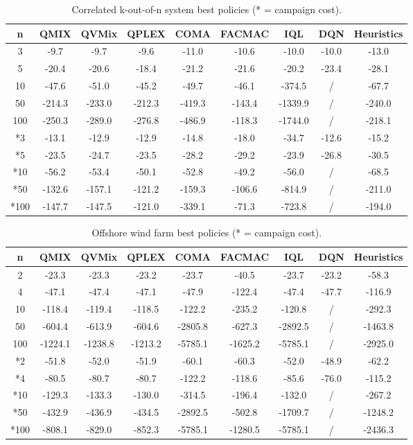 \begin{table}
\centering
\caption{Correlated k-out-of-n system best policies (* = campaign cost).}
\label{tab:correlatedkoutofnresults}
\begin{tabular}{c|ccccccc|c}
\toprule
n & QMIX & QVMix & QPLEX & COMA & FACMAC & IQL & DQN & Heuristics \\
\midrule
3 & -9.7 & -9.7 & -9.6 & -11.0 & -10.6 & -10.0 & -10.0 & -13.0 \\
5 & -20.4 & -20.6 & -18.4 & -21.2 & -21.6 & -20.2 & -23.4 & -28.1 \\
10 & -47.6 & -51.0 & -45.2 & -49.7 & -46.1 & -374.5 & / & -67.7 \\
50 & -214.3 & -233.0 & -212.3 & -419.3 & -143.4 & -1339.9 & / & -240.0 \\
100 & -250.3 & -289.0 & -276.8 & -486.9 & -118.3 & -1744.0 & / & -218.1 \\
\midrule
*3 & -13.1 & -12.9 & -12.9 & -14.8 & -18.0 & -34.7 & -12.6 & -15.2 \\
*5 & -23.5 & -24.7 & -23.5 & -28.2 & -29.2 & -23.9 & -26.8 & -30.5 \\
*10 & -56.2 & -53.4 & -50.1 & -52.8 & -49.2 & -56.0 & / & -68.5 \\
*50 & -132.6 & -157.1 & -121.2 & -159.3 & -106.6 & -814.9 & / & -211.0 \\
*100 & -147.7 & -147.5 & -121.0 & -339.1 & -71.3 & -723.8 & / & -194.0 \\
\bottomrule
\end{tabular}
\end{table}



\begin{table}
\centering
\caption{Offshore wind farm best policies (* = campaign cost).}
\label{tab:owfresults}
\begin{tabular}{c|ccccccc|c}
\toprule
n & QMIX & QVMix & QPLEX & COMA & FACMAC & IQL & DQN & Heuristics \\
\midrule
2 & -23.3 & -23.3 & -23.2 & -23.7 & -40.5 & -23.7 & -23.2 & -58.3 \\
4 & -47.1 & -47.4 & -47.1 & -47.9 & -122.4 & -47.4 & -47.7 & -116.9 \\
10 & -118.4 & -119.4 & -118.5 & -122.2 & -235.2 & -120.8 & / & -292.3 \\
50 & -604.4 & -613.9 & -604.6 & -2805.8 & -627.3 & -2892.5 & / & -1463.8 \\
100 & -1224.1 & -1238.8 & -1213.2 & -5785.1 & -1625.2 & -5785.1 & / & -2925.0 \\
\midrule
*2 & -51.8 & -52.0 & -51.9 & -60.1 & -60.3 & -52.0 & -48.9 & -62.2 \\
*4 & -80.5 & -80.7 & -80.7 & -122.2 & -118.6 & -85.6 & -76.0 & -115.2 \\
*10 & -129.3 & -133.3 & -130.0 & -314.5 & -196.4 & -132.0 & / & -267.2 \\
*50 & -432.9 & -436.9 & -434.5 & -2892.5 & -502.8 & -1709.7 & / & -1248.2 \\
*100 & -808.1 & -829.0 & -852.3 & -5785.1 & -1280.5 & -5785.1 & / & -2436.3 \\
\bottomrule
\end{tabular}
\end{table}


